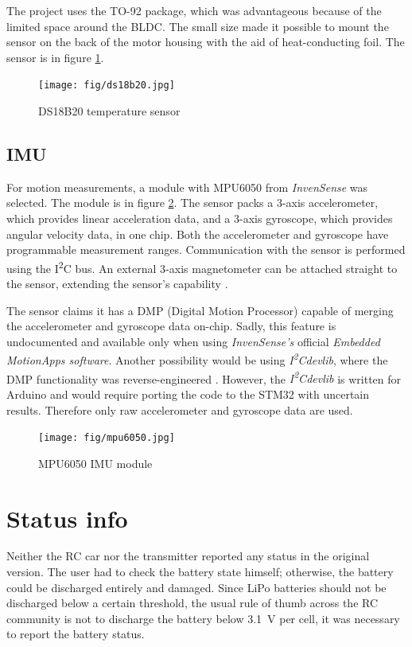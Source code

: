 The project uses the TO-92 package, which was advantageous because of the limited space around the BLDC. The small size made it possible to mount the sensor on the back of the motor housing with the aid of heat-conducting foil. The sensor is in figure \ref{fig:ds18b20}.
\begin{figure}[h]
\centering
\texttt{[image: fig/ds18b20.jpg]}
\caption{DS18B20 temperature sensor \cite{ds_pic}}
\label{fig:ds18b20}
\end{figure}

\subsection{IMU}	
For motion measurements, a module with MPU6050 from \textit{InvenSense} was selected. The module is in figure \ref{fig:mpu}. The sensor packs a 3-axis accelerometer, which provides linear acceleration data, and a 3-axis gyroscope, which provides angular velocity data, in one chip. Both the accelerometer and gyroscope have programmable measurement ranges. Communication with the sensor is performed using the I\textsuperscript{2}C bus. An external 3-axis magnetometer can be attached straight to the sensor, extending the sensor's capability \cite{mpu_datasheet}.

The sensor claims it has a DMP (Digital Motion Processor) capable of merging the accelerometer and gyroscope data on-chip. Sadly, this feature is undocumented and available only when using \textit{InvenSense's} official \textit{Embedded MotionApps software}. Another possibility would be using \textit{I\textsuperscript{2}Cdevlib}, where the DMP functionality was reverse-engineered \cite{i2cdevlib}. However, the \textit{I\textsuperscript{2}Cdevlib} is written for Arduino and would require porting the code to the STM32 with uncertain results. Therefore only raw accelerometer and gyroscope data are used.
\begin{figure}[h]
\centering
\texttt{[image: fig/mpu6050.jpg]}
\caption{MPU6050 IMU module \cite{mpu_pic}}
\label{fig:mpu}
\end{figure}

\section{Status info}
\label{sec:hw_status}
Neither the RC car nor the transmitter reported any status in the original version. The user had to check the battery state himself; otherwise, the battery could be discharged entirely and damaged. Since LiPo batteries should not be discharged below a certain threshold, the usual rule of thumb across the RC community is not to discharge the battery below \SI{3.1}{\V} per cell, it was necessary to report the battery status.

